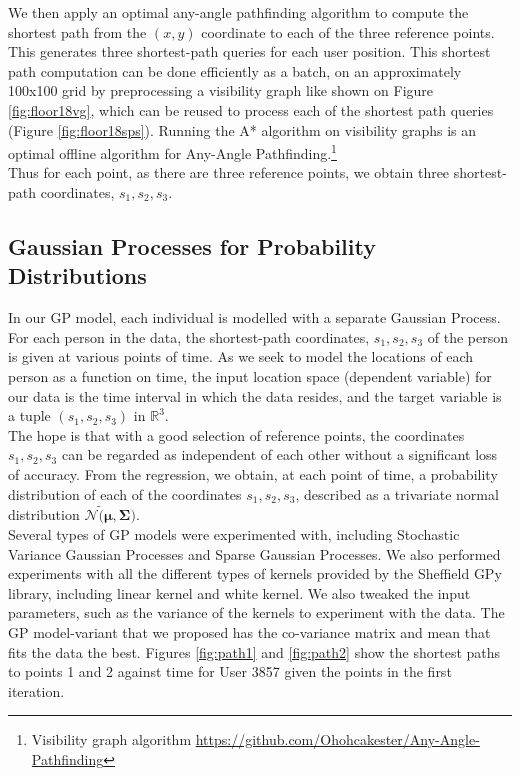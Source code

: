 \documentclass[letterpaper]{article}
\begin{document}
We then apply an optimal any-angle pathfinding algorithm to compute the shortest path from the $(x,y)$ coordinate to each of the three reference points. This generates three shortest-path queries for each user position. This shortest path computation can be done efficiently as a batch, on an approximately 100x100 grid by preprocessing a visibility graph like shown on Figure \ref{fig:floor18vg}, which can be reused to process each of the shortest path queries (Figure \ref{fig:floor18sps}). Running the A* algorithm on visibility graphs is an optimal offline algorithm for Any-Angle Pathfinding.\footnote{Visibility graph algorithm \url{https://github.com/Ohohcakester/Any-Angle-Pathfinding}}\\

Thus for each point, as there are three reference points, we obtain three shortest-path coordinates, $s_1, s_2, s_3$.

\subsection{Gaussian Processes for Probability Distributions}

In our GP model, each individual is modelled with a separate Gaussian Process. For each person in the data, the shortest-path coordinates, $s_1, s_2, s_3$ of the person is given at various points of time. As we seek to model the locations of each person as a function on time, the input location space (dependent variable) for our data is the time interval in which the data resides, and the target variable is a tuple $(s_1, s_2, s_3)$ in $\mathbb{R}^3$. \\

The hope is that with a good selection of reference points, the coordinates $s_1, s_2, s_3$ can be regarded as independent of each other without a significant loss of accuracy. From the regression, we obtain, at each point of time, a probability distribution of each of the coordinates $s_1, s_2, s_3$, described as a trivariate normal distribution $\mathcal{N}\tilde (\boldsymbol{\mu},\boldsymbol{\Sigma})$. \\

Several types of GP models were experimented with, including Stochastic Variance Gaussian Processes and Sparse Gaussian Processes. We also performed experiments with all the different types of kernels provided by the Sheffield GPy library, including linear kernel and white kernel. We also tweaked the input parameters, such as the variance of the kernels to experiment with the data. The GP model-variant that we proposed has the co-variance matrix and mean that fits the data the best. Figures \ref{fig:path1} and \ref{fig:path2} show the shortest paths to points 1 and 2 against time for User 3857 given the points in the first iteration. \\
\end{document}
